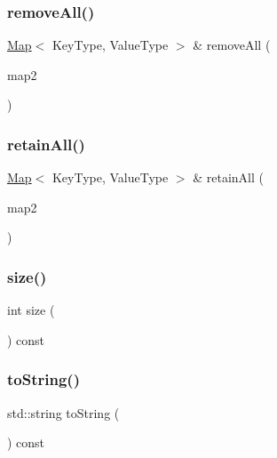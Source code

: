 \mbox{\label{classMap_aef8a9fb79f29126a485f697c3069801c}} 
\subsubsection{\texorpdfstring{remove\+All()}{removeAll()}}
{\footnotesize\ttfamily \mbox{\hyperlink{classMap}{Map}}$<$ Key\+Type, Value\+Type $>$ \& remove\+All (\begin{DoxyParamCaption}\item[{const \mbox{\hyperlink{classMap}{Map}}$<$ Key\+Type, Value\+Type $>$ \&}]{map2 }\end{DoxyParamCaption})}

\mbox{\label{classMap_abe07b84e7c8050870da86c3d2005f3bb}} 
\subsubsection{\texorpdfstring{retain\+All()}{retainAll()}}
{\footnotesize\ttfamily \mbox{\hyperlink{classMap}{Map}}$<$ Key\+Type, Value\+Type $>$ \& retain\+All (\begin{DoxyParamCaption}\item[{const \mbox{\hyperlink{classMap}{Map}}$<$ Key\+Type, Value\+Type $>$ \&}]{map2 }\end{DoxyParamCaption})}

\mbox{\label{classMap_af9593d4a5ff4274efaf429cb4f9e57cc}} 
\subsubsection{\texorpdfstring{size()}{size()}}
{\footnotesize\ttfamily int size (\begin{DoxyParamCaption}{ }\end{DoxyParamCaption}) const}

\mbox{\label{classMap_a1fe5121d6528fdea3f243321b3fa3a49}} 
\subsubsection{\texorpdfstring{to\+String()}{toString()}}
{\footnotesize\ttfamily std\+::string to\+String (\begin{DoxyParamCaption}{ }\end{DoxyParamCaption}) const}

